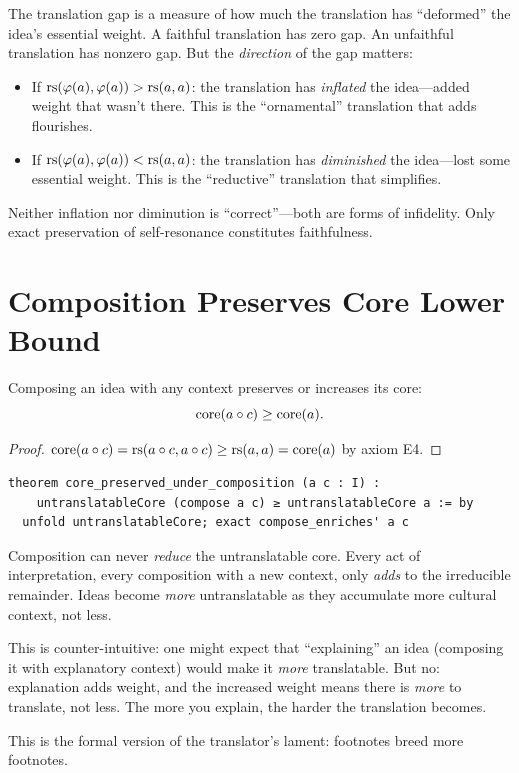 \begin{interpretation}
The translation gap is a measure of how much the translation has
``deformed'' the idea's essential weight.  A faithful translation has
zero gap.  An unfaithful translation has nonzero gap.  But the
\emph{direction} of the gap matters:
\begin{itemize}
\item If $\mathrm{rs}(\varphi(a), \varphi(a)) > \mathrm{rs}(a, a)$: the translation
  has \emph{inflated} the idea---added weight that wasn't there.
  This is the ``ornamental'' translation that adds flourishes.
\item If $\mathrm{rs}(\varphi(a), \varphi(a)) < \mathrm{rs}(a, a)$: the translation
  has \emph{diminished} the idea---lost some essential weight.
  This is the ``reductive'' translation that simplifies.
\end{itemize}
Neither inflation nor diminution is ``correct''---both are forms of
infidelity.  Only exact preservation of self-resonance constitutes
faithfulness.
\end{interpretation}

\section{Composition Preserves Core Lower Bound}

\begin{theorem}
\label{thm:core-comp}
Composing an idea with any context preserves or increases its core:
\[
  \mathrm{core}(a \circ c) \geq \mathrm{core}(a).
\]
\end{theorem}

\begin{proof}
$\mathrm{core}(a \circ c) = \mathrm{rs}(a \circ c, a \circ c)
\geq \mathrm{rs}(a, a) = \mathrm{core}(a)$ by axiom E4.
\end{proof}

\begin{lstlisting}
theorem core_preserved_under_composition (a c : I) :
    untranslatableCore (compose a c) ≥ untranslatableCore a := by
  unfold untranslatableCore; exact compose_enriches' a c
\end{lstlisting}

\begin{remark}
Composition can never \emph{reduce} the untranslatable core.  Every
act of interpretation, every composition with a new context, only
\emph{adds} to the irreducible remainder.  Ideas become \emph{more}
untranslatable as they accumulate more cultural context, not less.

This is counter-intuitive: one might expect that ``explaining'' an idea
(composing it with explanatory context) would make it \emph{more}
translatable.  But no: explanation adds weight, and the increased weight
means there is \emph{more} to translate, not less.  The more you
explain, the harder the translation becomes.

This is the formal version of the translator's lament: footnotes breed
more footnotes.
\end{remark}



